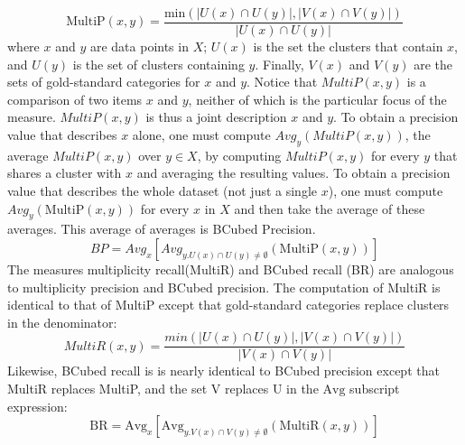 \begin{equation}
\text{MultiP}(x,y) = \frac{\text{min}(|U(x)\cap U(y)|, |V(x) \cap V(y)|)}{|U(x) \cap U(y)|}
\end{equation}
where $x$ and $y$ are data points in $X$; $U(x)$ is the set the clusters that contain $x$, 
and $U(y)$ is the set of clusters containing $y$.
Finally, 
$V(x)$ and $V(y)$ are the sets of gold-standard categories for $x$ and $y$. 
Notice that $MultiP(x,y)$ is a comparison of two items $x$ and $y$, neither of which is the 
particular focus of the measure. $MultiP(x,y)$ is thus a joint description $x$ and $y$. 
To obtain a precision value that describes $x$ alone, one must compute $Avg_{y}(MultiP (x,y))$, the 
average $MultiP(x,y)$ over $y \in X$, by computing $MultiP(x,y)$ for every $y$ that shares a cluster with $x$ 
and averaging the resulting values. To obtain a precision value that describes the whole dataset (not just a single $x$), 
one must compute $Avg_y(\text{MultiP}(x,y))$ for every $x$ in $X$ and then take the average of these averages. 
This average of averages is BCubed Precision. 
\begin{equation}
BP=Avg_x [Avg_{y.U(x) \cap U(y) \neq \emptyset}(\text{MultiP}(x,y))]
\end{equation}
The measures multiplicity recall(MultiR) and BCubed recall (BR) are analogous to multiplicity precision and
 BCubed precision. The computation of MultiR is identical to that of MultiP 
 except that gold-standard categories replace clusters in the denominator: 
\begin{equation}
MultiR(x,y) = \frac{min(|U(x) \cap U(y)|, |V(x) \cap V (y)|)}{|V(x) \cap V(y)|}
\end{equation}
Likewise, BCubed recall is is nearly identical to BCubed precision except that MultiR replaces MultiP, and the set V replaces U in the $\text{Avg}$ subscript expression:
\begin{equation} 
\textrm{BR} = \textrm{Avg}_x [\textrm{Avg}_{y.V(x) \cap V(y) \neq \emptyset}(\text{MultiR}(x,y))]
\end{equation}


